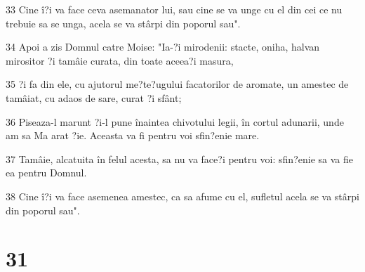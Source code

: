 \par 33 Cine î?i va face ceva asemanator lui, sau cine se va unge cu el din cei ce nu trebuie sa se unga, acela se va stârpi din poporul sau".
\par 34 Apoi a zis Domnul catre Moise: "Ia-?i mirodenii: stacte, oniha, halvan mirositor ?i tamâie curata, din toate aceea?i masura,
\par 35 ?i fa din ele, cu ajutorul me?te?ugului facatorilor de aromate, un amestec de tamâiat, cu adaos de sare, curat ?i sfânt;
\par 36 Piseaza-l marunt ?i-l pune înaintea chivotului legii, în cortul adunarii, unde am sa Ma arat ?ie. Aceasta va fi pentru voi sfin?enie mare.
\par 37 Tamâie, alcatuita în felul acesta, sa nu va face?i pentru voi: sfin?enie sa va fie ea pentru Domnul.
\par 38 Cine î?i va face asemenea amestec, ca sa afume cu el, sufletul acela se va stârpi din poporul sau".

\chapter{31}

